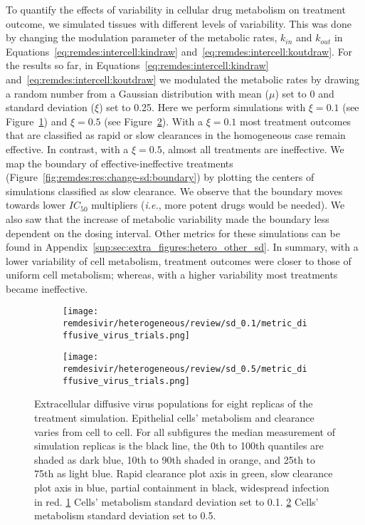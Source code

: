 To quantify the effects of variability in cellular drug metabolism on treatment outcome, we simulated tissues with different levels of variability. This was done by changing the modulation parameter of the metabolic rates, $k_{in}$ and  $k_{out}$ in Equations~\ref{eq:remdes:intercell:kindraw} and~\ref{eq:remdes:intercell:koutdraw}. For the results so far, in Equations~\ref{eq:remdes:intercell:kindraw} and~\ref{eq:remdes:intercell:koutdraw} we modulated the metabolic rates by drawing a random number from a Gaussian distribution with mean ($\mu$) set to 0 and standard deviation ($\xi$) set to 0.25. Here we perform simulations with $\xi=0.1$ (see Figure~\ref{fig:remdes:res:change-sd:0.1sd}) and $\xi=0.5$ (see Figure~\ref{fig:remdes:res:change-sd:0.5sd}). With a $\xi=0.1$ most treatment outcomes that are classified as rapid or slow clearances in the homogeneous case remain effective. In contrast, with a $\xi=0.5$, almost all treatments are ineffective. We map the boundary of effective-ineffective treatments (Figure~\ref{fig:remdes:res:change-sd:boundary}) by plotting the centers of simulations classified as slow clearance. We observe that the boundary moves towards lower $IC_{50}$ multipliers (\textit{i.e.}, more potent drugs would be needed). We also saw that the increase of metabolic variability made the boundary less dependent on the dosing interval. Other metrics for these simulations can be found in Appendix~\ref{sup:sec:extra_figures:hetero_other_sd}. In summary, with a lower variability of cell metabolism, treatment outcomes were closer to those of uniform cell metabolism; whereas, with a higher variability most treatments became ineffective.

\begin{figure}[H]
\centering
\begin{subfigure}{0.8\textwidth}
\centering
\texttt{[image: remdesivir/heterogeneous/review/sd\_0.1/metric\_diffusive\_virus\_trials.png]}
\caption{}\label{fig:remdes:res:change-sd:0.1sd}
\end{subfigure}
%
\begin{subfigure}{0.8\textwidth}
\centering
\texttt{[image: remdesivir/heterogeneous/review/sd\_0.5/metric\_diffusive\_virus\_trials.png]}
\caption{}\label{fig:remdes:res:change-sd:0.5sd}
\end{subfigure}
\caption{
Extracellular diffusive virus populations for eight replicas of the treatment simulation. Epithelial cells' metabolism and clearance varies from cell to cell. For all subfigures the median measurement of simulation replicas is the black line, the 0th to 100th quantiles are shaded as dark blue, 10th to 90th shaded in orange, and 25th to 75th as light blue. Rapid clearance plot axis in green, slow clearance plot axis in blue, partial containment in black, widespread infection in red.
 \ref{fig:remdes:res:change-sd:0.1sd} Cells' metabolism standard deviation set to 0.1. \ref{fig:remdes:res:change-sd:0.5sd} Cells' metabolism standard deviation set to 0.5.}\label{fig:remdes:res:change-sd}
\end{figure}


